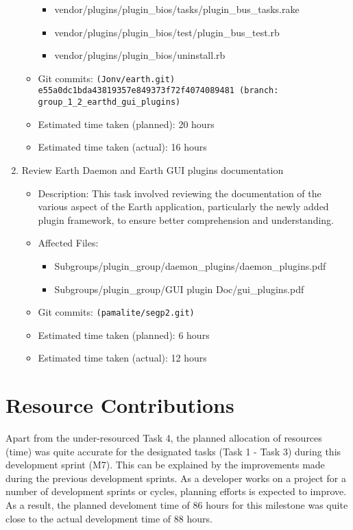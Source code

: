 \documentclass{article}
\begin{document}
\begin{enumerate}
\begin{itemize}
\begin{itemize}
                    \item vendor/plugins/plugin\_bios/tasks/plugin\_bus\_tasks.rake
                    \item vendor/plugins/plugin\_bios/test/plugin\_bus\_test.rb
                    \item vendor/plugins/plugin\_bios/uninstall.rb
                \end{itemize}
            \item Git commits: \texttt{(Jonv/earth.git) e55a0dc1bda43819357e849373f72f4074089481 (branch: group\_1\_2\_earthd\_gui\_plugins)}
            \item Estimated time taken (planned): 20 hours
            \item Estimated time taken (actual): 16 hours
        \end{itemize}
    \item Review Earth Daemon and Earth GUI plugins documentation
        \begin{itemize}
            \item Description: This task involved reviewing the documentation of the various aspect of the Earth application, particularly the newly added plugin framework, to ensure better comprehension and understanding.
            \item Affected Files:
                \begin{itemize}
                    \item Subgroups/plugin\_group/daemon\_plugins/daemon\_plugins.pdf
                    \item Subgroups/plugin\_group/GUI plugin Doc/gui\_plugins.pdf
                \end{itemize}
            \item Git commits: \texttt{(pamalite/segp2.git)}
            \item Estimated time taken (planned): 6 hours
            \item Estimated time taken (actual): 12 hours
        \end{itemize}
\end{enumerate}

\section*{Resource Contributions}

Apart from the under-resourced Task 4, the planned allocation of resources (time) was quite accurate for the designated tasks (Task 1 - Task 3) during this development sprint (M7). This can be explained by the improvements made during the previous development sprints. As a developer works on a project for a number of development sprints or cycles, planning efforts is expected to improve. As a result, the planned develoment time of 86 hours for this milestone was quite close to the actual development time of 88 hours. \\
\end{document}
